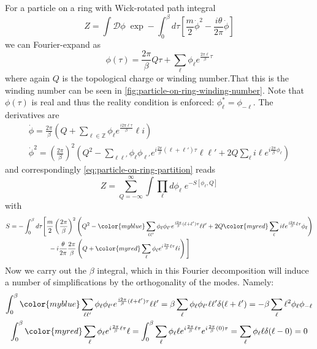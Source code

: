 \documentclass{report}
\begin{document}
 For a particle on a ring with Wick-rotated path
integral 
\begin{equation}\label{eq:particle-on-ring-partition}
	Z = \int \mathcal{D}\phi \;\exp - \int_0^\beta d\tau 
		\left[
			\frac{m}{2}\dot{\phi}^2 - \frac{i\theta}{2\pi}\dot{\phi}
		\right]
\end{equation}
we can Fourier-expand as 
\begin{equation}\label{eq:particle-on-ring-fourier}
	\phi(\tau) 
		= \frac{2\pi}{\beta}Q \tau + \sum_\ell \phi_\ell
		e^{\frac{2\pi\ell}{\beta}\tau} 
\end{equation}
where again $ Q $ is the topological charge or winding number.That this 
is the winding number can be seen in \cref{fig:particle-on-ring-winding-number}.
Note that $ \phi(\tau) $ is real and thus the reality condition is enforced: 
$ \phi_\ell^\ast = \phi_{-\ell} $.
The derivatives are 
\begin{gather*}
	\dot{\phi} = \frac{2\pi}{\beta}\left(
		Q + \sum_{\ell \in \mathbb{Z}} \phi_\ell e^{\frac{i2\pi\ell\tau}{\beta}}
			\ell i 
			\right)\\
	\dot{\phi}^2 
		= \left(\frac{2\pi}{\beta}\right)^2 
		\left(Q^2 - \sum_{\ell\ell'}\phi_\ell \phi_{\ell'}
			e^{i\frac{2\pi}{\beta}(\ell + \ell') \tau} \ell \ell'
			+ 2 Q \sum_\ell i\ell e^{i\frac{2\pi}{\beta}\phi_\ell}
		\right)
\end{gather*}
and correspondingly \cref{eq:particle-on-ring-partition} reads
\begin{equation*}
	Z = \sum_{Q=-\infty}^{\infty} \int \prod_\ell d\phi_\ell \;
	e^{-S[\phi_\ell, Q]}
\end{equation*}
with 
\begin{align*}
	S &=  - 
	\int_0^\beta d\tau \Bigg[
			\frac{m}{2}\left(\frac{2\pi}{\beta}\right)^2 
				\left(
					Q^2 - {\color{myblue}\sum_{\ell\ell'}
						\phi_\ell \phi_{\ell'}
						e^{\frac{i2\pi}{\beta}(\ell + \ell')\tau }\ell \ell'}
						+ 2Q {\color{myred}\sum_\ell i\ell e^{\frac{i2\pi}{\beta}\ell \tau}
							\phi_\ell }
							\right)\\
					&\qquad\qquad  \qquad
					 - i\frac{\theta}{2\pi} \frac{2\pi}{\beta}
					\left(Q + {\color{myred}\sum_\ell \phi_\ell
					e^{i\frac{2\pi}{\beta}\ell\tau}\ell i}\right)
		\Bigg]
\end{align*}
Now we carry out the $ \beta $ integral, which in this Fourier decomposition 
will induce a number of simplifications by the orthogonality of the modes. 
Namely:
\begin{gather*}
	\int_0^\beta {\color{myblue}\sum_{\ell\ell'}
					\phi_\ell \phi_{\ell'}
					e^{\frac{i2\pi}{\beta}(\ell + \ell')\tau }\ell \ell'}
		= \beta\sum_\ell \phi_\ell \phi_{\ell'} \ell \ell' \delta(\ell+\ell')  
		=- \beta \sum_\ell \ell^2 \phi_\ell \phi_{-\ell} \\
	\int_{0}^{\beta}
		{\color{myred} 
		\sum_\ell \phi_\ell
		e^{i\frac{2\pi}{\beta}\ell\tau}\ell
		}
		=  \int_{0}^{\beta}
		\sum_\ell \phi_\ell \ell
		e^{i\frac{2\pi}{\beta}\ell\tau}
		e^{i\frac{2\pi}{\beta}(0)\tau}
		= \sum_\ell \phi_\ell \ell \delta(\ell - 0)
		= 0
\end{gather*}
\end{document}
